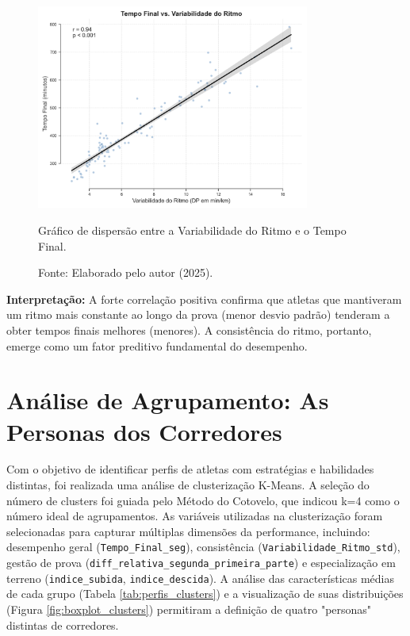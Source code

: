 \begin{figure}[H]
    \centering
    \includegraphics[width=0.8\textwidth]{Imagens/scatterplot_correlacao_ritmo.png}
    \caption{Gráfico de dispersão entre a Variabilidade do Ritmo e o Tempo Final.}
    \label{fig:scatter_variabilidade}
    \caption*{Fonte: Elaborado pelo autor (2025).}
\end{figure}

\textbf{Interpretação:} A forte correlação positiva confirma que atletas que mantiveram um ritmo mais constante ao longo da prova (menor desvio padrão) tenderam a obter tempos finais melhores (menores). A consistência do ritmo, portanto, emerge como um fator preditivo fundamental do desempenho.

\section{Análise de Agrupamento: As Personas dos Corredores}

Com o objetivo de identificar perfis de atletas com estratégias e habilidades distintas, foi realizada uma análise de clusterização K-Means. A seleção do número de clusters foi guiada pelo Método do Cotovelo, que indicou k=4 como o número ideal de agrupamentos. As variáveis utilizadas na clusterização foram selecionadas para capturar múltiplas dimensões da performance, incluindo: desempenho geral (\texttt{Tempo\_Final\_seg}), consistência (\texttt{Variabilidade\_Ritmo\_std}), gestão de prova (\texttt{diff\_relativa\_segunda\_primeira\_parte}) e especialização em terreno (\texttt{indice\_subida}, \texttt{indice\_descida}).
A análise das características médias de cada grupo (Tabela \ref{tab:perfis_clusters}) e a visualização de suas distribuições (Figura \ref{fig:boxplot_clusters}) permitiram a definição de quatro "personas" distintas de corredores.

